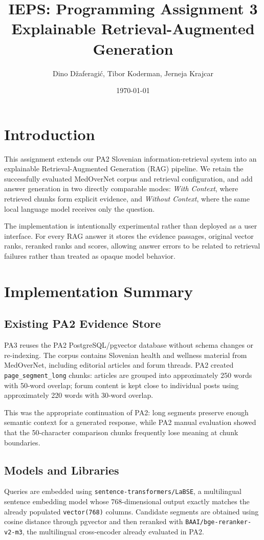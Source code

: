 \documentclass[9pt]{IEEEtran}
\title{\vspace{0ex}
IEPS: Programming Assignment 3\\
Explainable Retrieval-Augmented Generation}
\author{Dino Džaferagić, Tibor Koderman, Jerneja Krajcar}\vspace{-4.0ex}
\date{\today}
\begin{document}
\maketitle

\section{Introduction}
This assignment extends our PA2 Slovenian information-retrieval system into
an explainable Retrieval-Augmented Generation (RAG) pipeline.  We retain the
successfully evaluated MedOverNet corpus and retrieval configuration, and add
answer generation in two directly comparable modes: \textit{With Context},
where retrieved chunks form explicit evidence, and \textit{Without Context},
where the same local language model receives only the question.

The implementation is intentionally experimental rather than deployed as a
user interface.  For every RAG answer it stores the evidence passages,
original vector ranks, reranked ranks and scores, allowing answer errors to be
related to retrieval failures rather than treated as opaque model behavior.

\section{Implementation Summary}

\subsection{Existing PA2 Evidence Store}
PA3 reuses the PA2 PostgreSQL/pgvector database without schema changes or
re-indexing.  The corpus contains Slovenian health and wellness material from
MedOverNet, including editorial articles and forum threads.  PA2 created
\texttt{page\_segment\_long} chunks: articles are grouped into approximately
250 words with 50-word overlap; forum content is kept close to individual
posts using approximately 220 words with 30-word overlap.

This was the appropriate continuation of PA2: long segments preserve enough
semantic context for a generated response, while PA2 manual evaluation showed
that the 50-character comparison chunks frequently lose meaning at chunk
boundaries.

\subsection{Models and Libraries}
Queries are embedded using \texttt{sentence-transformers/LaBSE}, a
multilingual sentence embedding model whose 768-dimensional output exactly
matches the already populated \texttt{vector(768)} columns.  Candidate
segments are obtained using cosine distance through pgvector and then
reranked with \texttt{BAAI/bge-reranker-v2-m3}, the multilingual
cross-encoder already evaluated in PA2.
\end{document}
